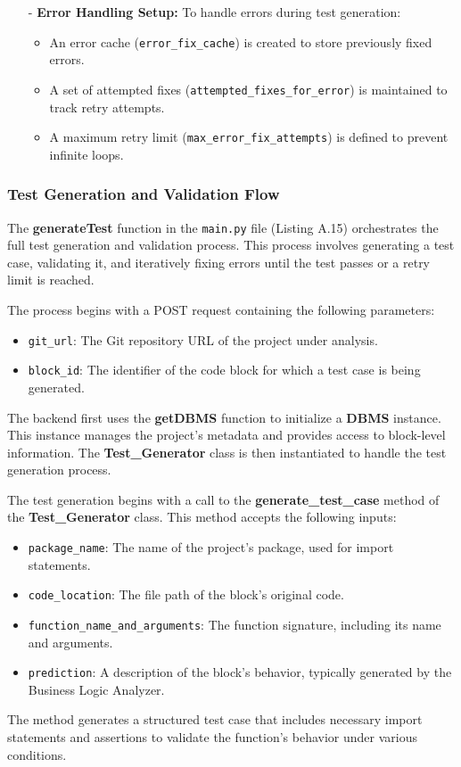 \begin{itemize}
    \item[-] \textbf{Error Handling Setup:} To handle errors during test generation:
    \begin{itemize}
        \item An error cache (\texttt{error\_fix\_cache}) is created to store previously fixed errors.
        \item A set of attempted fixes (\texttt{attempted\_fixes\_for\_error}) is maintained to track retry attempts.
        \item A maximum retry limit (\texttt{max\_error\_fix\_attempts}) is defined to prevent infinite loops.
    \end{itemize}
\end{itemize}

\subsubsection{Test Generation and Validation Flow}

The \textbf{generateTest} function in the \texttt{main.py} file (Listing A.15) orchestrates the full test generation and validation process. This process involves generating a test case, validating it, and iteratively fixing errors until the test passes or a retry limit is reached.

The process begins with a POST request containing the following parameters:
\begin{itemize}
    \item \texttt{git\_url}: The Git repository URL of the project under analysis.
    \item \texttt{block\_id}: The identifier of the code block for which a test case is being generated.
\end{itemize}

The backend first uses the \textbf{getDBMS} function to initialize a \textbf{DBMS} instance. This instance manages the project's metadata and provides access to block-level information. The \textbf{Test\_Generator} class is then instantiated to handle the test generation process.

The test generation begins with a call to the \textbf{generate\_test\_case} method of the \textbf{Test\_Generator} class. This method accepts the following inputs:
\begin{itemize}
    \item \texttt{package\_name}: The name of the project's package, used for import statements.
    \item \texttt{code\_location}: The file path of the block's original code.
    \item \texttt{function\_name\_and\_arguments}: The function signature, including its name and arguments.
    \item \texttt{prediction}: A description of the block's behavior, typically generated by the Business Logic Analyzer.
\end{itemize}
The method generates a structured test case that includes necessary import statements and assertions to validate the function's behavior under various conditions.

